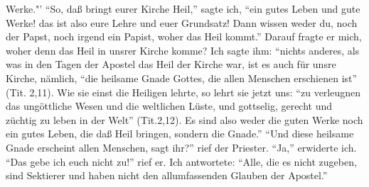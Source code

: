 Werke."' "`So, daß bringt eurer Kirche Heil,"' sagte ich, "`ein
gutes Leben und gute Werke! das ist also eure Lehre und euer
Grundsatz! Dann wissen weder du, noch der Papst, noch irgend
ein Papist, woher das Heil kommt."' Darauf fragte er mich,
woher denn das Heil in unsrer Kirche komme? Ich sagte ihm:
"`nichts anderes, als was in den Tagen der Apostel das Heil der
Kirche war, ist es auch für unsre Kirche, nämlich, "`die heilsame
Gnade Gottes, die allen Menschen erschienen ist"' (Tit. 2,11).
Wie sie einst die Heiligen lehrte, so lehrt sie jetzt uns: "`zu 
verleugnen das ungöttliche Wesen und die weltlichen Lüste, und
gottselig, gerecht und züchtig zu leben in der Welt"' (Tit.2,12). 
Es sind also weder die guten Werke noch ein gutes Leben, die daß
Heil bringen, sondern die Gnade."' "`Und diese heilsame Gnade
erscheint allen Menschen, sagt ihr?"' rief der Priester. "`Ja,"'
erwiderte ich. "`Das gebe ich euch nicht zu!"' rief er. Ich 
antwortete: "`Alle, die es nicht zugeben, sind Sektierer und haben
nicht den allumfassenden Glauben der Apostel."'

